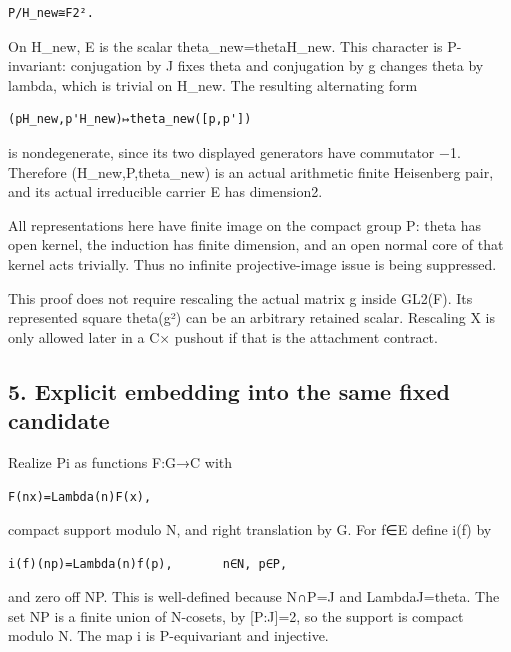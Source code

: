\begin{Verbatim}[fontsize=\small,breaklines=true,breakanywhere=true]
P/H_new≅F2².
\end{Verbatim}

On H\_new, E is the scalar theta\_new=theta\textbar H\_new. This
character is P-invariant: conjugation by J fixes theta and conjugation
by g changes theta by lambda, which is trivial on H\_new. The resulting
alternating form

\begin{Verbatim}[fontsize=\small,breaklines=true,breakanywhere=true]
(pH_new,p'H_new)↦theta_new([p,p'])
\end{Verbatim}

is nondegenerate, since its two displayed generators have commutator −1.
Therefore (H\_new,P,theta\_new) is an actual arithmetic finite
Heisenberg pair, and its actual irreducible carrier E has dimension2.

All representations here have finite image on the compact group P: theta
has open kernel, the induction has finite dimension, and an open normal
core of that kernel acts trivially. Thus no infinite projective-image
issue is being suppressed.

This proof does not require rescaling the actual matrix g inside GL2(F).
Its represented square theta(g²) can be an arbitrary retained scalar.
Rescaling X is only allowed later in a C× pushout if that is the
attachment contract.

\hypertarget{rank~2-explicit-embedding-into-the-same-fixed-candidate}{%
\subsection{5. Explicit embedding into the same fixed
candidate}\label{rank~2-explicit-embedding-into-the-same-fixed-candidate}}

Realize Pi as functions F:G→C with

\begin{Verbatim}[fontsize=\small,breaklines=true,breakanywhere=true]
F(nx)=Lambda(n)F(x),
\end{Verbatim}

compact support modulo N, and right translation by G. For f∈E define
i(f) by

\begin{Verbatim}[fontsize=\small,breaklines=true,breakanywhere=true]
i(f)(np)=Lambda(n)f(p),       n∈N, p∈P,
\end{Verbatim}

and zero off NP. This is well-defined because N∩P=J and
Lambda\textbar J=theta. The set NP is a finite union of N-cosets, by
{[}P:J{]}=2, so the support is compact modulo N. The map i is
P-equivariant and injective.

